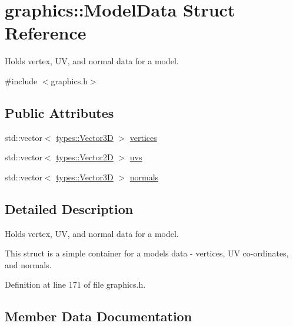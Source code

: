 \hypertarget{structgraphics_1_1_model_data}{}\section{graphics\+:\+:Model\+Data Struct Reference}
\label{structgraphics_1_1_model_data}


Holds vertex, U\+V, and normal data for a model.  




{\ttfamily \#include $<$graphics.\+h$>$}

\subsection*{Public Attributes}
\begin{DoxyCompactItemize}
\item 
std\+::vector$<$ \hyperlink{structtypes_1_1_vector3_d}{types\+::\+Vector3\+D} $>$ \hyperlink{structgraphics_1_1_model_data_a6aee645ba74e36a81efc32d094bc9df9}{vertices}
\item 
std\+::vector$<$ \hyperlink{structtypes_1_1_vector2_d}{types\+::\+Vector2\+D} $>$ \hyperlink{structgraphics_1_1_model_data_ae7380400c402308ee93459a1fcf5b76a}{uvs}
\item 
std\+::vector$<$ \hyperlink{structtypes_1_1_vector3_d}{types\+::\+Vector3\+D} $>$ \hyperlink{structgraphics_1_1_model_data_a91996c9e01bf134a114db6796da79cfc}{normals}
\end{DoxyCompactItemize}


\subsection{Detailed Description}
Holds vertex, U\+V, and normal data for a model. 

This struct is a simple container for a model\textquotesingle{}s data -\/ vertices, U\+V co-\/ordinates, and normals. 

Definition at line 171 of file graphics.\+h.



\subsection{Member Data Documentation}
\hypertarget{structgraphics_1_1_model_data_a91996c9e01bf134a114db6796da79cfc}{}
